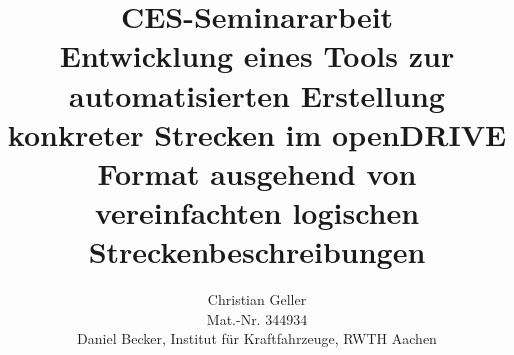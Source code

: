 \documentclass[11pt,
	a4paper,
	ngerman,
	bibliography=totoc,
	captions=tableheading,
	headings=normal,
	parskip=half*,
	chapterentrydots=true,
	numbers=noenddot
	]{scrreprt}
\begin{document}
%
\title{CES-Seminararbeit  \vspace{4cm} \\ Entwicklung eines Tools zur automatisierten Erstellung konkreter Strecken im openDRIVE Format ausgehend von vereinfachten logischen Streckenbeschreibungen}
\author{Christian Geller \\  Mat.-Nr. 344934 \\ Daniel Becker, Institut für Kraftfahrzeuge, RWTH Aachen}
\maketitle

\thispagestyle{empty}
{}
\pagestyle{plain}
\setcounter{page}{2}
\renewcommand{\contentsname}{Inhalt}
\tableofcontents
\newpage
\pagestyle{ika}


\setlength\LTleft{-6pt}
\setlength\LTright{0pt} 


\newpage
\pagestyle{plain}
\printbibliography[
	heading=bibnumbered,
	title=Literaturverzeichnis
]
\newpage
\pagestyle{apx}
%
\end{document}
